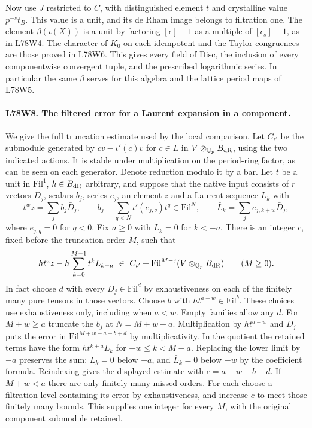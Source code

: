 Now use $J$ restricted to $C$, with distinguished element $t$ and
crystalline value $p^{-s}t_B$. This value is a unit, and its de Rham
image belongs to filtration one. The element $\beta(\iota(X))$ is
a unit by factoring $[\epsilon]-1$ as a multiple of
$[\epsilon_s]-1$, as in L78W4. The character of $K_0$ on each
idempotent and the Taylor congruences are those proved in L78W6.
This gives every field of $\mathrm{Disc}$, the inclusion of every
componentwise convergent tuple, and the prescribed logarithmic
series. In particular the same $\beta$ serves for this algebra and
the lattice period maps of L78W5.

\paragraph{L78W8. The filtered error for a Laurent expansion in a component.}
We give the full truncation estimate used by the local comparison.
Let $C_{\iota'}$ be the submodule generated by
$c v-\iota'(c)v$ for $c\in L$ in $V\otimes_{\mathbb Q_p}B_{\rm dR}$,
using the two indicated actions. It is stable under multiplication
on the period-ring factor, as can be seen on each generator.
Denote reduction modulo it by a bar. Let $t$ be a unit in
$\mathrm{Fil}^1$, $h\in B_{\rm dR}$ arbitrary, and suppose that
the native input consists of $r$ vectors $D_j$, scalars $b_j$,
series $e_j$, an element $z$ and a Laurent sequence $L_k$ with
\[
 t^w\bar z=\sum_j b_j\bar D_j,\qquad
 b_j-\sum_{q<N}\iota'(e_{j,q})t^q\in\mathrm{Fil}^N,\qquad
 \bar L_k=\sum_j e_{j,k+w}\bar D_j,
\]
where $e_{j,q}=0$ for $q<0$. Fix $a\ge0$ with $L_k=0$ for
$k<-a$. There is an integer $c$, fixed before the truncation order
$M$, such that
\[
  h t^a z-h\sum_{k=0}^{M-1}t^k L_{k-a}
          \ \in\ C_{\iota'}+\mathrm{Fil}^{M-c}
            (V\otimes_{\mathbb Q_p}B_{\rm dR})\qquad(M\ge0).
\]
In fact choose $d$ with every $D_j\in\mathrm{Fil}^d$ by
exhaustiveness on each of the finitely many pure tensors in those
vectors. Choose $b$ with $h t^{a-w}\in\mathrm{Fil}^b$. These choices
use exhaustiveness only, including when $a<w$. Empty families
allow any $d$. For $M+w\ge a$ truncate the $b_j$ at $N=M+w-a$.
Multiplication by $h t^{a-w}$ and $D_j$ puts the error in
$\mathrm{Fil}^{M+w-a+b+d}$ by multiplicativity. In the quotient
the retained terms have the form $ht^{k+a}\bar L_k$ for
$-w\le k<M-a$. Replacing the lower limit by $-a$ preserves the
sum: $L_k=0$ below $-a$, and $\bar L_k=0$ below $-w$ by the
coefficient formula. Reindexing gives the displayed estimate
with $c=a-w-b-d$. If $M+w<a$ there are only finitely many missed
orders. For each choose a filtration level containing its error
by exhaustiveness, and increase $c$ to meet those finitely many
bounds. This supplies one integer for every $M$, with the original
component submodule retained.

